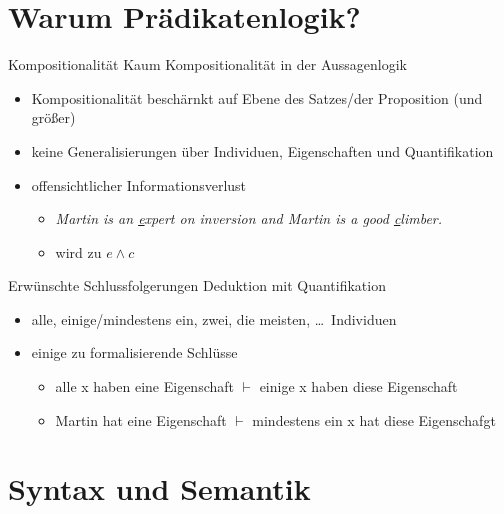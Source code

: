 \section{Warum Prädikatenlogik?}

\begin{frame}
  {Kompositionalität}
  \onslide<+->
  \onslide<+->
  Kaum Kompositionalität in der Aussagenlogik\\
  \Halbzeile
  \begin{itemize}[<+->]
    \item Kompositionalität beschärnkt auf Ebene des \alert{Satzes\slash der Proposition} (und größer)
    \item keine Generalisierungen über \alert{Individuen}, \alert{Eigenschaften} und \alert{Quantifikation}
    \item offensichtlicher Informationsverlust
      \begin{itemize}[<+->]
        \item \textit{Martin is an \underline{e}xpert on inversion and Martin is a good \underline{c}limber.}
        \item wird zu $e\wedge c$
      \end{itemize}
  \end{itemize}
\end{frame}

\begin{frame}
  {Erwünschte Schlussfolgerungen}
  \onslide<+->
  \onslide<+->
  Deduktion mit Quantifikation\\
  \Halbzeile
  \begin{itemize}[<+->]
    \item alle, einige\slash mindestens ein, zwei, die meisten, \ldots\ Individuen
    \item einige zu formalisierende Schlüsse
      \begin{itemize}[<+->]
        \item \alert{alle x} haben eine Eigenschaft $\vdash$ \alert{einige x} haben diese Eigenschaft
        \item \alert{Martin} hat eine Eigenschaft $\vdash$ \alert{mindestens ein x} hat diese Eigenschafgt
      \end{itemize}
  \end{itemize}
\end{frame}

\section{Syntax und Semantik}

